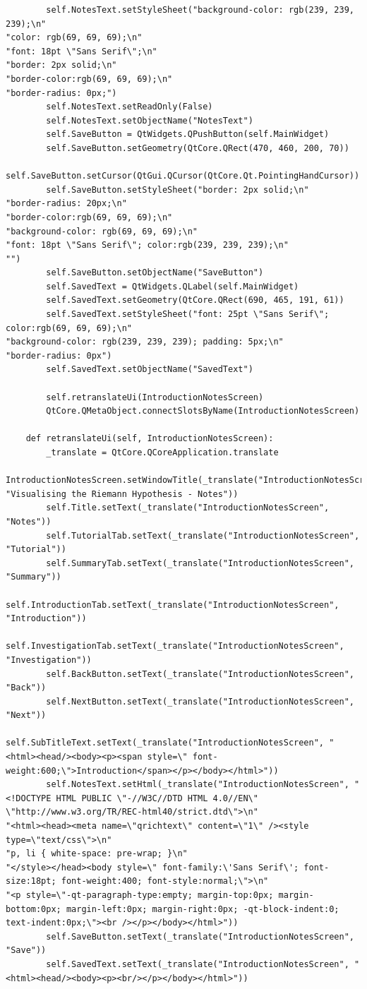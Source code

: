 \documentclass{article}
\begin{document}
\begin{lstlisting}
        self.NotesText.setStyleSheet("background-color: rgb(239, 239, 239);\n"
"color: rgb(69, 69, 69);\n"
"font: 18pt \"Sans Serif\";\n"
"border: 2px solid;\n"
"border-color:rgb(69, 69, 69);\n"
"border-radius: 0px;")
        self.NotesText.setReadOnly(False)
        self.NotesText.setObjectName("NotesText")
        self.SaveButton = QtWidgets.QPushButton(self.MainWidget)
        self.SaveButton.setGeometry(QtCore.QRect(470, 460, 200, 70))
        self.SaveButton.setCursor(QtGui.QCursor(QtCore.Qt.PointingHandCursor))
        self.SaveButton.setStyleSheet("border: 2px solid;\n"
"border-radius: 20px;\n"
"border-color:rgb(69, 69, 69);\n"
"background-color: rgb(69, 69, 69);\n"
"font: 18pt \"Sans Serif\"; color:rgb(239, 239, 239);\n"
"")
        self.SaveButton.setObjectName("SaveButton")
        self.SavedText = QtWidgets.QLabel(self.MainWidget)
        self.SavedText.setGeometry(QtCore.QRect(690, 465, 191, 61))
        self.SavedText.setStyleSheet("font: 25pt \"Sans Serif\"; color:rgb(69, 69, 69);\n"
"background-color: rgb(239, 239, 239); padding: 5px;\n"
"border-radius: 0px")
        self.SavedText.setObjectName("SavedText")

        self.retranslateUi(IntroductionNotesScreen)
        QtCore.QMetaObject.connectSlotsByName(IntroductionNotesScreen)

    def retranslateUi(self, IntroductionNotesScreen):
        _translate = QtCore.QCoreApplication.translate
        IntroductionNotesScreen.setWindowTitle(_translate("IntroductionNotesScreen", "Visualising the Riemann Hypothesis - Notes"))
        self.Title.setText(_translate("IntroductionNotesScreen", "Notes"))
        self.TutorialTab.setText(_translate("IntroductionNotesScreen", "Tutorial"))
        self.SummaryTab.setText(_translate("IntroductionNotesScreen", "Summary"))
        self.IntroductionTab.setText(_translate("IntroductionNotesScreen", "Introduction"))
        self.InvestigationTab.setText(_translate("IntroductionNotesScreen", "Investigation"))
        self.BackButton.setText(_translate("IntroductionNotesScreen", "Back"))
        self.NextButton.setText(_translate("IntroductionNotesScreen", "Next"))
        self.SubTitleText.setText(_translate("IntroductionNotesScreen", "<html><head/><body><p><span style=\" font-weight:600;\">Introduction</span></p></body></html>"))
        self.NotesText.setHtml(_translate("IntroductionNotesScreen", "<!DOCTYPE HTML PUBLIC \"-//W3C//DTD HTML 4.0//EN\" \"http://www.w3.org/TR/REC-html40/strict.dtd\">\n"
"<html><head><meta name=\"qrichtext\" content=\"1\" /><style type=\"text/css\">\n"
"p, li { white-space: pre-wrap; }\n"
"</style></head><body style=\" font-family:\'Sans Serif\'; font-size:18pt; font-weight:400; font-style:normal;\">\n"
"<p style=\"-qt-paragraph-type:empty; margin-top:0px; margin-bottom:0px; margin-left:0px; margin-right:0px; -qt-block-indent:0; text-indent:0px;\"><br /></p></body></html>"))
        self.SaveButton.setText(_translate("IntroductionNotesScreen", "Save"))
        self.SavedText.setText(_translate("IntroductionNotesScreen", "<html><head/><body><p><br/></p></body></html>"))
\end{lstlisting}
\end{document}
